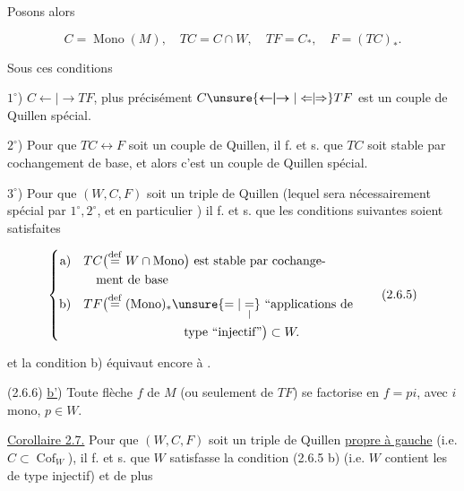 Posons alors

\[
 C=\operatorname{Mono}(M),\quad TC=C\cap W,\quad TF=C_*,\quad F=(TC)_*.\tag*{(2.6.4)}
\]

Sous ces conditions

$1^\circ$) $C\mathrel{\leftarrow\!\!|\!\!\rightarrow}TF$, plus précisément $C\unsure{\mathrel{\boldsymbol{\leftarrow\!\!|\!\!\rightarrow}}|\mathrel{\Leftarrow\!\!|\!\!\Rightarrow}}TF$
est un couple de Quillen spécial.

$2^\circ$) Pour que $TC\longleftrightarrow F$ soit un couple
de Quillen, il f. et s. que $TC$ soit
stable par cochangement de base, et alors
c'est un couple de Quillen spécial.

$3^\circ$) Pour que $(W,C,F)$ soit un triple de
Quillen (lequel sera nécessairement spécial
par $1^\circ,2^\circ$,  et en particulier ) il
f. et s. que les conditions suivantes soient
satisfaites

\[
\left\{\begin{aligned}
 \text{a)}\quad & TC\bigl(\overset{\mathrm{def}}{=}W\cap\mathrm{Mono}\bigr)\ \text{est stable par cochange-}\\
 &\quad\text{ment de base}\\
 \text{b)}\quad & TF\bigl(\overset{\mathrm{def}}{=}(\mathrm{Mono})_*
 \unsure{=|\underset{\vert}{=}}\text{ ``applications de}\\
 &\hspace{8em}\text{type ``injectif''}\bigr)\subset W.
\end{aligned}\right.\tag*{(2.6.5)}
\]


et la condition b) équivaut encore à .

(2.6.6) \uline{b'}) Toute flèche $f$ de $M$ (ou seulement
de $TF$) se factorise en $f=pi$, avec
$i$ mono, $p\in W$. 

\uline{Corollaire 2.7.} 
 Pour que $(W,C,F)$ soit un triple de
Quillen \uline{propre à gauche} (i.e. $C\subset\operatorname{Cof}_W$), il
f. et s. que $W$ satisfasse la condition
(2.6.5 b) (i.e.  $W$ contient les  de
type injectif) et de plus

